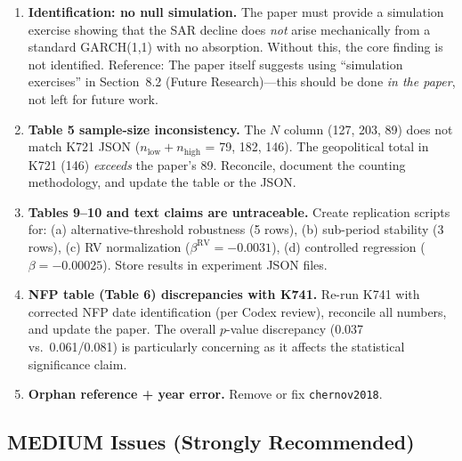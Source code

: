 \documentclass[12pt,a4paper]{article}
\begin{document}
\begin{enumerate}[label=\textbf{S\arabic*.}, leftmargin=2em]
  \item \textbf{Identification: no null simulation.}  The paper must provide a simulation exercise showing that the SAR decline does \emph{not} arise mechanically from a standard GARCH(1,1) with no absorption.  Without this, the core finding is not identified.  Reference: The paper itself suggests using ``simulation exercises'' in Section~8.2 (Future Research)---this should be done \emph{in the paper}, not left for future work.

  \item \textbf{Table 5 sample-size inconsistency.}  The $N$ column (127, 203, 89) does not match K721 JSON ($n_{\text{low}}+n_{\text{high}}$ = 79, 182, 146).  The geopolitical total in K721 (146) \emph{exceeds} the paper's 89.  Reconcile, document the counting methodology, and update the table or the JSON.

  \item \textbf{Tables 9--10 and text claims are untraceable.}  Create replication scripts for: (a) alternative-threshold robustness (5 rows), (b) sub-period stability (3 rows), (c) RV normalization ($\beta^{\text{RV}} = -0.0031$), (d) controlled regression ($\beta = -0.00025$).  Store results in experiment JSON files.

  \item \textbf{NFP table (Table 6) discrepancies with K741.}  Re-run K741 with corrected NFP date identification (per Codex review), reconcile all numbers, and update the paper.  The overall $p$-value discrepancy (0.037 vs.\ 0.061/0.081) is particularly concerning as it affects the statistical significance claim.

  \item \textbf{Orphan reference + year error.}  Remove or fix \texttt{chernov2018}.
\end{enumerate}

\subsection*{\textcolor{warncolor}{MEDIUM Issues (Strongly Recommended)}}
\end{document}
